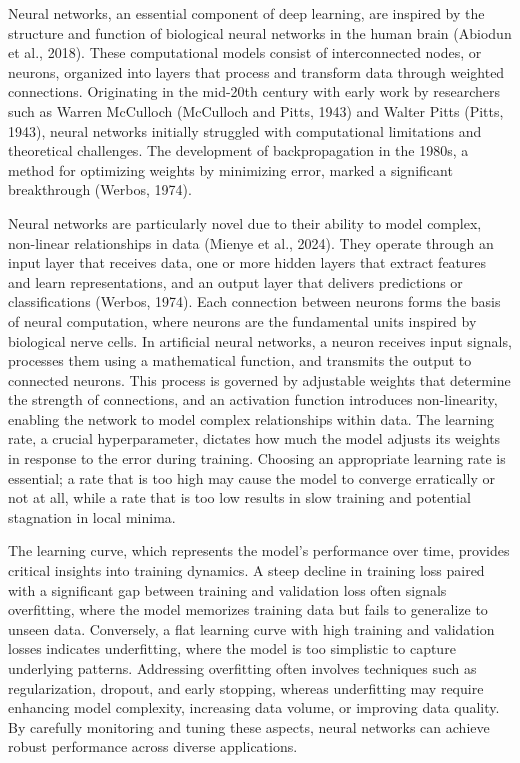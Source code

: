 \documentclass[
  letterpaper,
  11pt,
  english,
  singlespacing,
  headsepline]{MastersDoctoralThesis}
\begin{document}
\begin{spacing}{1.5}
Neural networks, an essential component of deep learning, are inspired
by the structure and function of biological neural networks in the human
brain (Abiodun et al., 2018). These computational models consist of
interconnected nodes, or neurons, organized into layers that process and
transform data through weighted connections. Originating in the mid-20th
century with early work by researchers such as Warren McCulloch
(McCulloch and Pitts, 1943) and Walter Pitts (Pitts, 1943), neural
networks initially struggled with computational limitations and
theoretical challenges. The development of backpropagation in the 1980s,
a method for optimizing weights by minimizing error, marked a
significant breakthrough (Werbos, 1974).

Neural networks are particularly novel due to their ability to model
complex, non-linear relationships in data (Mienye et al., 2024). They
operate through an input layer that receives data, one or more hidden
layers that extract features and learn representations, and an output
layer that delivers predictions or classifications (Werbos, 1974). Each
connection between neurons forms the basis of neural computation, where
neurons are the fundamental units inspired by biological nerve cells. In
artificial neural networks, a neuron receives input signals, processes
them using a mathematical function, and transmits the output to
connected neurons. This process is governed by adjustable weights that
determine the strength of connections, and an activation function
introduces non-linearity, enabling the network to model complex
relationships within data. The learning rate, a crucial hyperparameter,
dictates how much the model adjusts its weights in response to the error
during training. Choosing an appropriate learning rate is essential; a
rate that is too high may cause the model to converge erratically or not
at all, while a rate that is too low results in slow training and
potential stagnation in local minima.

The learning curve, which represents the model's performance over time,
provides critical insights into training dynamics. A steep decline in
training loss paired with a significant gap between training and
validation loss often signals overfitting, where the model memorizes
training data but fails to generalize to unseen data. Conversely, a flat
learning curve with high training and validation losses indicates
underfitting, where the model is too simplistic to capture underlying
patterns. Addressing overfitting often involves techniques such as
regularization, dropout, and early stopping, whereas underfitting may
require enhancing model complexity, increasing data volume, or improving
data quality. By carefully monitoring and tuning these aspects, neural
networks can achieve robust performance across diverse applications.


\end{spacing}
\end{document}
